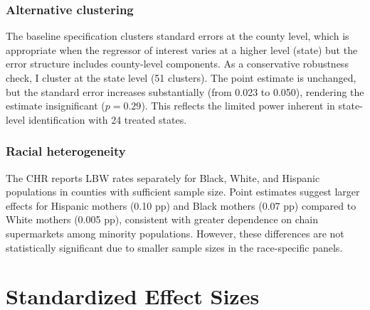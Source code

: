 \documentclass[12pt]{article}
\begin{document}
\subsubsection*{Alternative clustering} The baseline specification clusters standard errors at the county level, which is appropriate when the regressor of interest varies at a higher level (state) but the error structure includes county-level components. As a conservative robustness check, I cluster at the state level (51 clusters). The point estimate is unchanged, but the standard error increases substantially (from 0.023 to 0.050), rendering the estimate insignificant ($p = 0.29$). This reflects the limited power inherent in state-level identification with 24 treated states.

\subsubsection*{Racial heterogeneity} The CHR reports LBW rates separately for Black, White, and Hispanic populations in counties with sufficient sample size. Point estimates suggest larger effects for Hispanic mothers (0.10 pp) and Black mothers (0.07 pp) compared to White mothers (0.005 pp), consistent with greater dependence on chain supermarkets among minority populations. However, these differences are not statistically significant due to smaller sample sizes in the race-specific panels.

\section{Standardized Effect Sizes}
\label{sec:sde}


\end{document}
